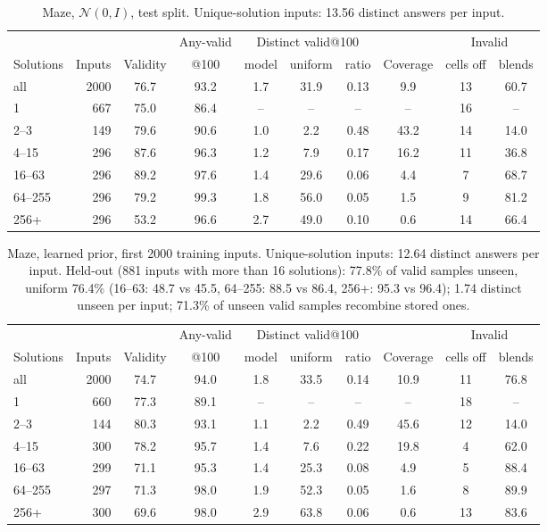\documentclass[11pt]{article}
\begin{document}
\begin{table}[H]
\centering\small
\begin{tabular}{@{}lrcccccccc@{}}
\toprule
& & & Any-valid & \multicolumn{3}{c}{Distinct valid@100} & & \multicolumn{2}{c}{Invalid} \\
\cmidrule(lr){5-7}\cmidrule(l){9-10}
Solutions & Inputs & Validity & @100 & model & uniform & ratio & Coverage & cells off & blends \\
\midrule
all & 2000 & 76.7 & 93.2 & 1.7 & 31.9 & 0.13 & 9.9 & 13 & 60.7 \\
1 & 667 & 75.0 & 86.4 & -- & -- & -- & -- & 16 & -- \\
2--3 & 149 & 79.6 & 90.6 & 1.0 & 2.2 & 0.48 & 43.2 & 14 & 14.0 \\
4--15 & 296 & 87.6 & 96.3 & 1.2 & 7.9 & 0.17 & 16.2 & 11 & 36.8 \\
16--63 & 296 & 89.2 & 97.6 & 1.4 & 29.6 & 0.06 & 4.4 & 7 & 68.7 \\
64--255 & 296 & 79.2 & 99.3 & 1.8 & 56.0 & 0.05 & 1.5 & 9 & 81.2 \\
256+ & 296 & 53.2 & 96.6 & 2.7 & 49.0 & 0.10 & 0.6 & 14 & 66.4 \\
\bottomrule
\end{tabular}
\caption{Maze, $\mathcal{N}(0,I)$, test split. Unique-solution inputs: 13.56 distinct answers per input.}
\end{table}

\begin{table}[H]
\centering\small
\begin{tabular}{@{}lrcccccccc@{}}
\toprule
& & & Any-valid & \multicolumn{3}{c}{Distinct valid@100} & & \multicolumn{2}{c}{Invalid} \\
\cmidrule(lr){5-7}\cmidrule(l){9-10}
Solutions & Inputs & Validity & @100 & model & uniform & ratio & Coverage & cells off & blends \\
\midrule
all & 2000 & 74.7 & 94.0 & 1.8 & 33.5 & 0.14 & 10.9 & 11 & 76.8 \\
1 & 660 & 77.3 & 89.1 & -- & -- & -- & -- & 18 & -- \\
2--3 & 144 & 80.3 & 93.1 & 1.1 & 2.2 & 0.49 & 45.6 & 12 & 14.0 \\
4--15 & 300 & 78.2 & 95.7 & 1.4 & 7.6 & 0.22 & 19.8 & 4 & 62.0 \\
16--63 & 299 & 71.1 & 95.3 & 1.4 & 25.3 & 0.08 & 4.9 & 5 & 88.4 \\
64--255 & 297 & 71.3 & 98.0 & 1.9 & 52.3 & 0.05 & 1.6 & 8 & 89.9 \\
256+ & 300 & 69.6 & 98.0 & 2.9 & 63.8 & 0.06 & 0.6 & 13 & 83.6 \\
\bottomrule
\end{tabular}
\caption{Maze, learned prior, first 2000 training inputs. Unique-solution inputs: 12.64 distinct answers per input. Held-out (881 inputs with more than 16 solutions): 77.8\% of valid samples unseen, uniform 76.4\% (16--63: 48.7 vs 45.5, 64--255: 88.5 vs 86.4, 256+: 95.3 vs 96.4); 1.74 distinct unseen per input; 71.3\% of unseen valid samples recombine stored ones.}
\end{table}
\end{document}

